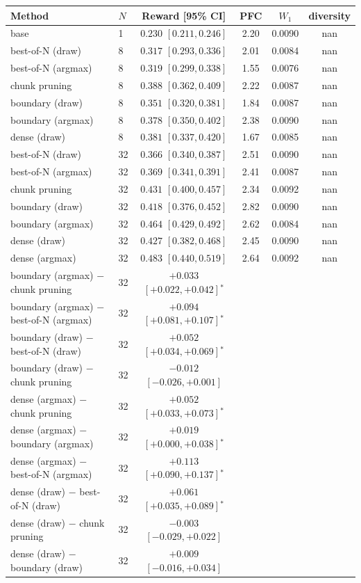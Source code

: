 \begin{tabular}{llcccc}
\toprule
Method & $N$ & Reward [95\% CI] & PFC & $W_1$ & diversity \\
\midrule
base & 1 & $0.230$ $[0.211, 0.246]$ & 2.20 & 0.0090 & nan \\
best-of-N (draw) & 8 & $0.317$ $[0.293, 0.336]$ & 2.01 & 0.0084 & nan \\
best-of-N (argmax) & 8 & $0.319$ $[0.299, 0.338]$ & 1.55 & 0.0076 & nan \\
chunk pruning & 8 & $0.388$ $[0.362, 0.409]$ & 2.22 & 0.0087 & nan \\
boundary (draw) & 8 & $0.351$ $[0.320, 0.381]$ & 1.84 & 0.0087 & nan \\
boundary (argmax) & 8 & $0.378$ $[0.350, 0.402]$ & 2.38 & 0.0090 & nan \\
dense (draw) & 8 & $0.381$ $[0.337, 0.420]$ & 1.67 & 0.0085 & nan \\
best-of-N (draw) & 32 & $0.366$ $[0.340, 0.387]$ & 2.51 & 0.0090 & nan \\
best-of-N (argmax) & 32 & $0.369$ $[0.341, 0.391]$ & 2.41 & 0.0087 & nan \\
chunk pruning & 32 & $0.431$ $[0.400, 0.457]$ & 2.34 & 0.0092 & nan \\
boundary (draw) & 32 & $0.418$ $[0.376, 0.452]$ & 2.82 & 0.0090 & nan \\
boundary (argmax) & 32 & $0.464$ $[0.429, 0.492]$ & 2.62 & 0.0084 & nan \\
dense (draw) & 32 & $0.427$ $[0.382, 0.468]$ & 2.45 & 0.0090 & nan \\
dense (argmax) & 32 & $0.483$ $[0.440, 0.519]$ & 2.64 & 0.0092 & nan \\
\midrule
boundary (argmax) $-$ chunk pruning & 32 & $+0.033$ $[+0.022, +0.042]$$^*$ & & & \\
boundary (argmax) $-$ best-of-N (argmax) & 32 & $+0.094$ $[+0.081, +0.107]$$^*$ & & & \\
boundary (draw) $-$ best-of-N (draw) & 32 & $+0.052$ $[+0.034, +0.069]$$^*$ & & & \\
boundary (draw) $-$ chunk pruning & 32 & $-0.012$ $[-0.026, +0.001]$ & & & \\
dense (argmax) $-$ chunk pruning & 32 & $+0.052$ $[+0.033, +0.073]$$^*$ & & & \\
dense (argmax) $-$ boundary (argmax) & 32 & $+0.019$ $[+0.000, +0.038]$$^*$ & & & \\
dense (argmax) $-$ best-of-N (argmax) & 32 & $+0.113$ $[+0.090, +0.137]$$^*$ & & & \\
dense (draw) $-$ best-of-N (draw) & 32 & $+0.061$ $[+0.035, +0.089]$$^*$ & & & \\
dense (draw) $-$ chunk pruning & 32 & $-0.003$ $[-0.029, +0.022]$ & & & \\
dense (draw) $-$ boundary (draw) & 32 & $+0.009$ $[-0.016, +0.034]$ & & & \\
\bottomrule
\end{tabular}

